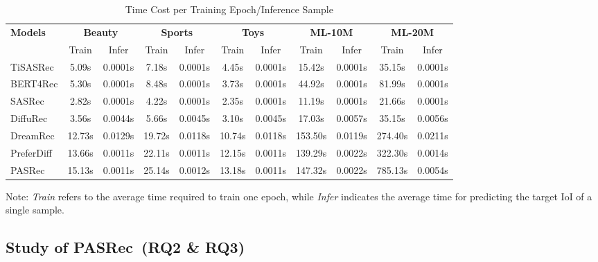 \documentclass[sigconf,nonacm]{acmart}
\newcommand{\modelname}{PASRec}
\begin{document}
\begin{table}[htbp]
\centering
\caption{Time Cost per Training Epoch/Inference Sample}
\label{tab:comparison_Complexity}
\renewcommand{\arraystretch}{1.2}
\begin{adjustbox}{max width=\columnwidth}
\begin{tabular}{lcccccccccc}
\toprule
\multirow{2}{*}{\textbf{Models}} 
  & \multicolumn{2}{c}{\textbf{Beauty}} 
  & \multicolumn{2}{c}{\textbf{Sports}} 
  & \multicolumn{2}{c}{\textbf{Toys}} 
  & \multicolumn{2}{c}{\textbf{ML-10M}}
  & \multicolumn{2}{c}{\textbf{ML-20M}} \\
\cmidrule(lr){2-3} \cmidrule(lr){4-5} \cmidrule(lr){6-7} \cmidrule(lr){8-9} \cmidrule(lr){10-11}
  & Train & Infer & Train & Infer & Train & Infer & Train & Infer & Train & Infer \\
\midrule
TiSASRec    & 5.09s  & 0.0001s & 7.18s  & 0.0001s & 4.45s  & 0.0001s  & 15.42s & 0.0001s & 35.15s & 0.0001s \\
BERT4Rec    & 5.30s  & 0.0001s & 8.48s  & 0.0001s & 3.73s  & 0.0001s  & 44.92s & 0.0001s & 81.99s & 0.0001s \\
SASRec      & 2.82s  & 0.0001s & 4.22s  & 0.0001s & 2.35s  & 0.0001s  & 11.19s & 0.0001s & 21.66s & 0.0001s \\
DiffuRec    & 3.56s  & 0.0044s & 5.66s  & 0.0045s & 3.10s  & 0.0045s  & 17.03s & 0.0057s & 35.15s & 0.0056s \\
DreamRec    & 12.73s & 0.0129s & 19.72s & 0.0118s & 10.74s & 0.0118s  & 153.50s & 0.0119s & 274.40s & 0.0211s \\
PreferDiff  & 13.66s & 0.0011s & 22.11s & 0.0011s & 12.15s & 0.0011s  & 139.29s & 0.0022s & 322.30s & 0.0014s \\
\modelname     & 15.13s & 0.0011s & 25.14s & 0.0012s & 13.18s & 0.0011s  & 147.32s & 0.0022s & 785.13s & 0.0054s \\
\bottomrule
\end{tabular}
\end{adjustbox}
\footnotesize{Note: \textit{Train} refers to the average time required to train one epoch, while \textit{Infer} indicates the average time for predicting the target IoI of a single sample.}
\end{table}


\subsection{Study of \modelname\ (RQ2 \& RQ3)}
\end{document}
